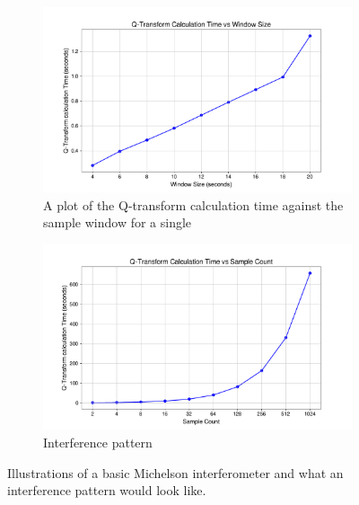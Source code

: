 \documentclass[12pt]{article}
\begin{document}

\begin{figure}[H]
  \centering
  \begin{subfigure}[t]{0.65\textwidth}
    \centering
    \includegraphics[width=\textwidth]{images/q_transform_time_vs_window_size.pdf}
    \caption{A plot of the Q-transform calculation time against the sample window for a single  }
    \label{fig:qtransform_vs_windowsize}
  \end{subfigure}
  \hspace{25px}
  \begin{subfigure}[t]{0.65\textwidth}
    \centering
    \includegraphics[width=\textwidth]{images/q_transform_time_vs_sample_count.pdf}
    \caption{Interference pattern}
    \label{fig:qtransform_vs_samplecount}
  \end{subfigure}
  \caption{Illustrations of a basic Michelson interferometer \cite{Stannered_Interferometer_2007,wiredsense_michelson_guide} and what an interference pattern would look like.}
\end{figure}
\end{document}
